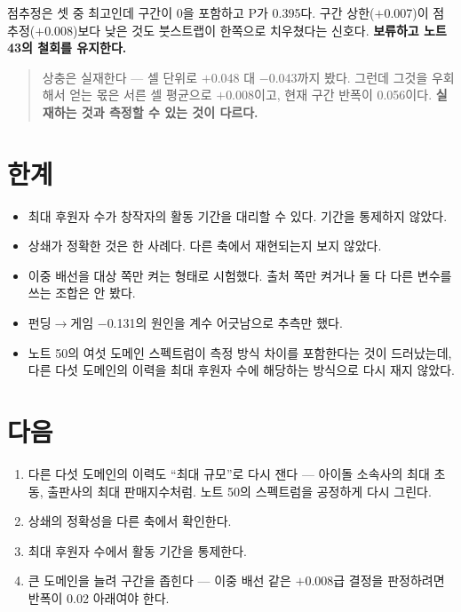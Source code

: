 \documentclass[10pt]{article}
\begin{document}
점추정은 셋 중 최고인데 구간이 0을 포함하고 P가 0.395다. 구간 상한($+$0.007)이
점추정($+$0.008)보다 낮은 것도 붓스트랩이 한쪽으로 치우쳤다는 신호다.
\textbf{보류하고 노트 43의 철회를 유지한다.}

\begin{quote}\fontsize{9.5}{11.5}\selectfont
상충은 실재한다 --- 셀 단위로 $+$0.048 대 $-$0.043까지 봤다. 그런데 그것을
우회해서 얻는 몫은 서른 셀 평균으로 $+$0.008이고, 현재 구간 반폭이 0.056이다.
\textbf{실재하는 것과 측정할 수 있는 것이 다르다.}
\end{quote}

\section{한계}

\begin{itemize}[leftmargin=1.1em,itemsep=0.15em]
\item 최대 후원자 수가 창작자의 활동 기간을 대리할 수 있다. 기간을 통제하지
      않았다.
\item 상쇄가 정확한 것은 한 사례다. 다른 축에서 재현되는지 보지 않았다.
\item 이중 배선을 대상 쪽만 켜는 형태로 시험했다. 출처 쪽만 켜거나 둘 다 다른
      변수를 쓰는 조합은 안 봤다.
\item 펀딩$\to$게임 $-$0.131의 원인을 계수 어긋남으로 추측만 했다.
\item 노트 50의 여섯 도메인 스펙트럼이 측정 방식 차이를 포함한다는 것이
      드러났는데, 다른 다섯 도메인의 이력을 최대 후원자 수에 해당하는 방식으로
      다시 재지 않았다.
\end{itemize}

\section{다음}

\begin{enumerate}[leftmargin=1.3em,itemsep=0.15em]
\item 다른 다섯 도메인의 이력도 ``최대 규모''로 다시 잰다 --- 아이돌 소속사의
      최대 초동, 출판사의 최대 판매지수처럼. 노트 50의 스펙트럼을 공정하게
      다시 그린다.
\item 상쇄의 정확성을 다른 축에서 확인한다.
\item 최대 후원자 수에서 활동 기간을 통제한다.
\item 큰 도메인을 늘려 구간을 좁힌다 --- 이중 배선 같은 $+$0.008급 결정을
      판정하려면 반폭이 0.02 아래여야 한다.
\end{enumerate}
\end{document}
